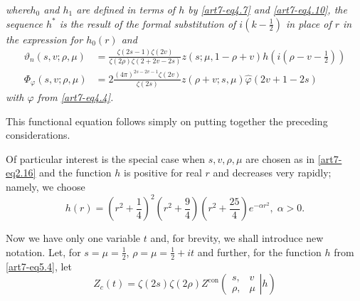 \textit{where\pageoriginale  $h_0$ and $h_1$ are defined in terms of $h$ by \eqref{art7-eq4.7} and \eqref{art7-eq4.10}, the sequence $h^\ast$ is the result of the formal substitution of $i(k-\frac{1}{2})$ in place of $r$ in the expression for $h_0(r)$ and}
\begin{align}
\vartheta_n(s, v; \rho, \mu) & = \frac{\zeta(2s-1) \zeta(2v)}{\zeta(2\rho) \zeta (2+2v-2s)} z (s;\mu, 1-\rho + v) h(i(\rho - v - \frac{1}{2}))
\label{art7-eq5.2}\\
\Phi_\varphi (s, v; \rho, \mu) & = 2 \frac{(4\pi)^{2s-2v-1} \zeta (2v)}{\zeta(2s)} z (\rho + v; s , \mu) \hat{\varphi } (2 v+ 1 - 2s)  
\label{art7-eq5.3}
\end{align}
\textit{with $\varphi$ from \eqref{art7-eq4.4}.}

This functional equation follows simply on putting together the preceding considerations. 

Of particular interest is the special case when $s, v, \rho, \mu$ are chosen as in \eqref{art7-eq2.16} and the function $h$ is positive for real $r$ and decreases very rapidly; namely, we choose 
\begin{equation}
h(r) = (r^2+ \frac{1}{4})^2 (r^2 + \frac{9}{4}) (r^2 + \frac{25}{4}) e^{-\alpha r^2}, \; \alpha > 0.
\label{art7-eq5.4}
\end{equation}

Now we have only one variable $t$ and, for brevity, we shall introduce new notation. Let, for $s = \mu = \frac{1}{2}$, $\rho= \mu = \frac{1}{2} +it$ and further, for the function $h$ from \eqref{art7-eq5.4}, let
\begin{equation}
Z_c (t) = \zeta (2s) \zeta(2\rho) Z^{\text{con}} 
\left(
\left.
\begin{matrix}
s, & v \\
\rho, & \mu
\end{matrix}
\right| h
\right)
\label{art7-eq5.5}
\end{equation}

